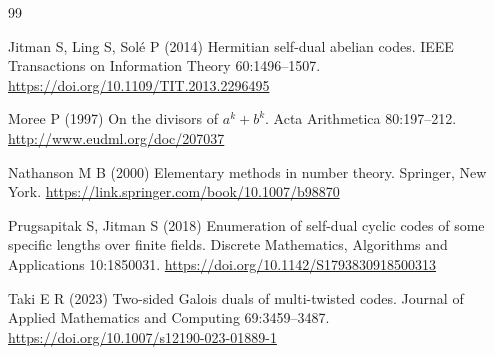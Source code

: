 \documentclass[pdflatex,sn-mathphys-num]{sn-jnl}%
\theoremstyle{thmstyleone}%
\theoremstyle{thmstyletwo}%
\theoremstyle{thmstylethree}%
\begin{document}
\begin{thebibliography}{99}
 

Jitman S,  Ling S,  Sol\'e P  (2014)
Hermitian self-dual abelian codes. IEEE Transactions on Information Theory 60:1496--1507. \url{https://doi.org/10.1109/TIT.2013.2296495}

Moree P  (1997)
On the divisors of $a^k+b^k$. Acta Arithmetica 80:197--212. \url{http://www.eudml.org/doc/207037}


          Nathanson M B (2000) Elementary methods in number theory. Springer, New York. \url{https://link.springer.com/book/10.1007/b98870} 

Prugsapitak S,  Jitman S (2018)
Enumeration of self-dual cyclic codes of some specific lengths over finite fields. Discrete Mathematics, Algorithms and Applications 10:1850031. \url{https://doi.org/10.1142/S1793830918500313}


 Taki E R (2023) Two-sided Galois duals of multi-twisted codes.  Journal of Applied Mathematics and Computing  69:3459--3487. \url{https://doi.org/10.1007/s12190-023-01889-1}
 

\end{thebibliography}
\end{document}
